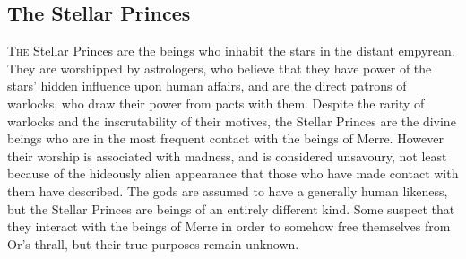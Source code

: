 \documentclass[paper=a4, fontsize=11pt]{scrartcl} %
\begin{document}
\begin{multicols}{2}
\subsection{The Stellar Princes}

\lettrine[lines=2]{\medievalsharp T}{he} Stellar Princes are the beings who inhabit the stars in the distant empyrean. They are worshipped by astrologers, who believe that they have power of the stars' hidden influence upon human affairs, and are the direct patrons of warlocks, who draw their power from pacts with them. Despite the rarity of warlocks and the inscrutability of their motives, the Stellar Princes are the divine beings who are in the most frequent contact with the beings of Merre. However their worship is associated with madness, and is considered unsavoury, not least because of the hideously alien appearance that those who have made contact with them have described. The gods are assumed to have a generally human likeness, but the Stellar Princes are beings of an entirely different kind. Some suspect that they interact with the beings of Merre in order to somehow free themselves from Or's thrall, but their true purposes remain unknown.

\end{multicols}

\end{document}
